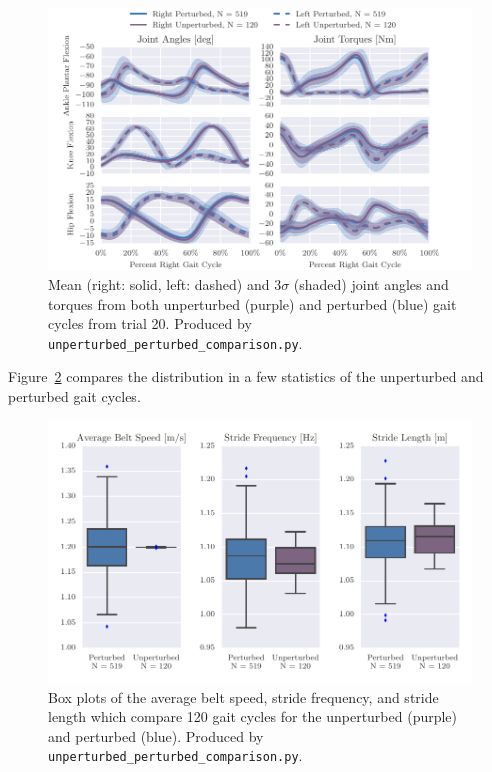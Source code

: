 \documentclass[10pt,a4paper,twocolumn]{article}
\begin{document}
\begin{figure}
  \centering
  \includegraphics{figures/unperturbed-perturbed-comparison.pdf}
  \cprotect\caption{Mean (right: solid, left: dashed) and $3\sigma$ (shaded)
    joint angles and torques from both unperturbed (purple) and perturbed
    (blue) gait cycles from trial 20. Produced by \verb|unperturbed_perturbed_comparison.py|.}
  \label{fig:angle-torque-comparison}
\end{figure}

Figure~\ref{fig:gait-cycle-stats-comparison} compares the distribution in a few
statistics of the unperturbed and perturbed gait cycles.

\begin{figure}
  \centering
  \includegraphics{figures/unperturbed-perturbed-boxplot-comparison.pdf}
  \cprotect\caption{Box plots of the average belt speed, stride frequency, and
    stride length which compare 120 gait cycles for the unperturbed (purple) and
    perturbed (blue). Produced by \verb|unperturbed_perturbed_comparison.py|.}
  \label{fig:gait-cycle-stats-comparison}
\end{figure}
\end{document}
